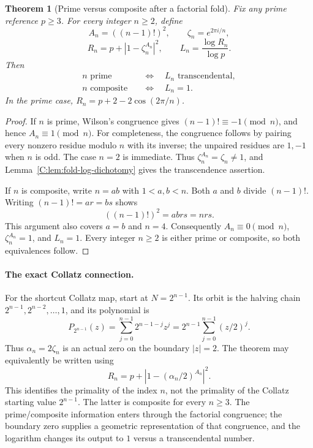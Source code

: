 \documentclass[11pt,a4paper]{article}
\newtheorem{theorem}{Theorem}[section]
\theoremstyle{definition}
\theoremstyle{remark}
\numberwithin{equation}{section}
\begin{document}
\begin{theorem}[Prime versus composite after a factorial fold]
\label{C:thm:factorial-fold-prime}
Fix any prime reference $p\ge3$. For every integer $n\ge2$, define
\[
 A_n=((n-1)!)^2,\qquad \zeta_n=e^{2\pi i/n},
\]
\[
 R_n=p+|1-\zeta_n^{A_n}|^2,\qquad
 L_n=\frac{\log R_n}{\log p}.
\]
Then
\[
 \boxed{
 \begin{aligned}
 n\text{ prime}&\quad\Longleftrightarrow\quad
       L_n\text{ transcendental},\\
 n\text{ composite}&\quad\Longleftrightarrow\quad L_n=1.
 \end{aligned}}
\]
In the prime case,
$R_n=p+2-2\cos(2\pi/n)$.
\end{theorem}
\begin{proof}
If $n$ is prime, Wilson's congruence gives $(n-1)!\equiv-1\pmod n$,
and hence $A_n\equiv1\pmod n$. For completeness, the congruence follows
by pairing every nonzero residue modulo $n$ with its inverse; the
unpaired residues are $1,-1$ when $n$ is odd. The case $n=2$ is immediate.
Thus $\zeta_n^{A_n}=\zeta_n\ne1$, and
Lemma~\ref{C:lem:fold-log-dichotomy} gives the transcendence assertion.

If $n$ is composite, write $n=ab$ with $1<a,b<n$. Both $a$ and $b$
divide $(n-1)!$. Writing $(n-1)!=ar=bs$ shows
\[
 ((n-1)!)^2=abrs=nrs.
\]
This argument also covers $a=b$ and $n=4$. Consequently
$A_n\equiv0\pmod n$, $\zeta_n^{A_n}=1$, and $L_n=1$.
Every integer $n\ge2$ is either prime or composite, so both
equivalences follow.
\end{proof}

\paragraph{The exact Collatz connection.}
For the shortcut Collatz map, start at $N=2^{n-1}$. Its orbit is the
halving chain $2^{n-1},2^{n-2},\ldots,1$, and its polynomial is
\[
 P_{2^{n-1}}(z)=\sum_{j=0}^{n-1}2^{n-1-j}z^j
 =2^{n-1}\sum_{j=0}^{n-1}(z/2)^j.
\]
Thus $\alpha_n=2\zeta_n$ is an actual zero on the boundary $|z|=2$.
The theorem may equivalently be written using
\[
 R_n=p+\left|1-(\alpha_n/2)^{A_n}\right|^2.
\]
This identifies the primality of the index $n$, not the primality of the
Collatz starting value $2^{n-1}$. The latter is composite for every
$n\ge3$. The prime/composite information enters through the factorial
congruence; the boundary zero supplies a geometric representation of
that congruence, and the logarithm changes its output to $1$ versus a
transcendental number.
\end{document}
